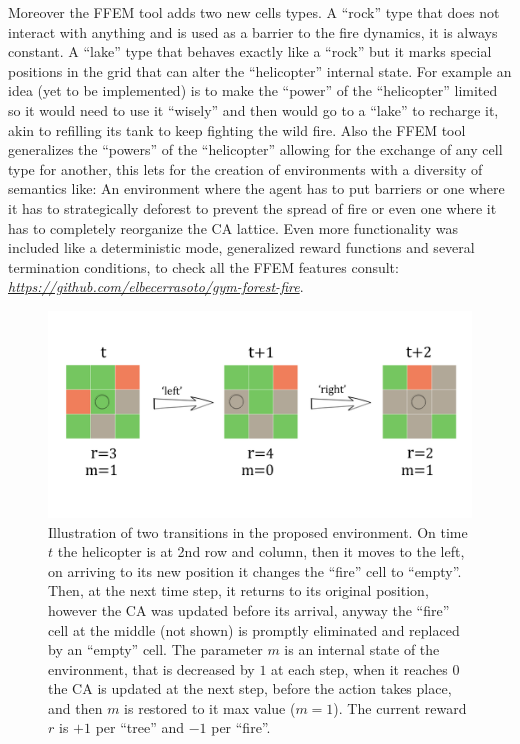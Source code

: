 \documentclass[
  openany]{book}
\begin{document}
Moreover the FFEM tool adds two new cells types. A ``rock'' type that does not interact with anything and is used as a barrier to the fire dynamics, it is always constant. A ``lake'' type that behaves exactly like a ``rock'' but it marks special positions in the grid that can alter the ``helicopter'' internal state. For example an idea (yet to be implemented) is to make the ``power'' of the ``helicopter'' limited so it would need to use it ``wisely'' and then would go to a ``lake'' to recharge it, akin to refilling its tank to keep fighting the wild fire. Also the FFEM tool generalizes the ``powers'' of the ``helicopter'' allowing for the exchange of any cell type for another, this lets for the creation of environments with a diversity of semantics like: An environment where the agent has to put barriers or one where it has to strategically deforest to prevent the spread of fire or even one where it has to completely reorganize the CA lattice. Even more functionality was included like a deterministic mode, generalized reward functions and several termination conditions, to check all the FFEM features consult: \emph{\url{https://github.com/elbecerrasoto/gym-forest-fire}}.



\begin{figure}

{\centering \includegraphics[width=0.8\linewidth]{pics/agent-env_3x3} 

}

\caption{Illustration of two transitions in the proposed environment. On time \(t\) the helicopter is at 2nd row and column, then it moves to the left, on arriving to its new position it changes the ``fire'' cell to ``empty''. Then, at the next time step, it returns to its original position, however the CA was updated before its arrival, anyway the ``fire'' cell at the middle (not shown) is promptly eliminated and replaced by an ``empty'' cell. The parameter \(m\) is an internal state of the environment, that is decreased by \(1\) at each step, when it reaches \(0\) the CA is updated at the next step, before the action takes place, and then \(m\) is restored to it max value (\(m=1\)). The current reward \(r\) is \(+1\) per ``tree'' and \(-1\) per ``fire''.}\label{fig:thesis-3-3-env}
\end{figure}
\end{document}

